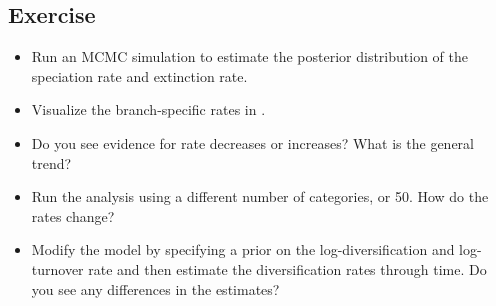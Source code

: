 

\subsection{Exercise}

\begin{itemize}
\item Run an MCMC simulation to estimate the posterior distribution of the speciation rate and extinction rate.
\item Visualize the branch-specific rates in \FigTree.
\item Do you see evidence for rate decreases or increases? What is the general trend?
\item Run the analysis using a different number of categories,  or 50. How do the rates change?
\item Modify the model by specifying a prior on the log-diversification and log-turnover rate and then estimate the diversification rates through time. Do you see any differences in the estimates? 
\end{itemize}







